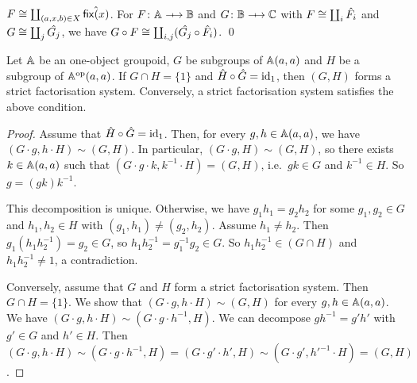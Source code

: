 \begin{proposition}
    \( F \cong \coprod_{(a,x,b) \in X} \hat{\mathsf{fix}(x)} \).
    For \( F \colon \Grp \profarrow \Grpb \) and \( G \colon \Grpb \profarrow \Grpc \) with \( F \cong \coprod_i \hat{F_i} \) and \( G \cong \coprod_j \hat{G_j} \), we have \( G \circ F \cong \coprod_{i,j} (\hat{G_j} \circ \hat{F_i}) \).
    \qed
\end{proposition}

\begin{proposition}
    Let \( \mathbb{A} \) be an one-object groupoid, \( G \) be subgroups of \( \mathbb{A}(a,a) \) and \( H \) be a subgroup of \( \mathbb{A}^{\mathrm{op}}(a,a) \).
    If \( G \cap H = \{ 1 \} \) and \( \hat{H} \circ \hat{G} = \mathrm{id}_1 \), then \( (G, H) \) forms a strict factorisation system.
    Conversely, a strict factorisation system satisfies the above condition.
\end{proposition}
\begin{proof}
    Assume that \( \hat{H} \circ \hat{G} = \mathrm{id}_1 \).
    Then, for every \( g, h \in \mathbb{A}(a,a) \), we have \( (G \cdot g, h \cdot H) \sim (G, H) \).
    In particular, \( (G \cdot g, H) \sim (G, H) \), so there exists \( k \in \mathbb{A}(a,a) \) such that \( (G \cdot g \cdot k, k^{-1} \cdot H) = (G, H) \), i.e.~\( gk \in G \) and \( k^{-1} \in H \).
    So \( g = (gk) k^{-1} \).

    This decomposition is unique.
    Otherwise, we have \( g_1 h_1 = g_2 h_2 \) for some \( g_1, g_2 \in G \) and \( h_1, h_2 \in H \) with \( (g_1, h_1) \neq (g_2, h_2) \).
    Assume \( h_1 \neq h_2 \).
    Then \( g_1 (h_1 h_2^{-1}) = g_2 \in G \), so \( h_1 h_2^{-1} = g_1^{-1} g_2 \in G \).
    So \( h_1 h_2^{-1} \in (G \cap H) \) and \( h_1 h_2^{-1} \neq 1 \), a contradiction.

    Conversely, assume that \( G \) and \( H \) form a strict factorisation system.
    Then \( G \cap H = \{ 1 \} \).
    We show that \( (G \cdot g, h \cdot H) \sim (G, H) \) for every \( g, h \in \mathbb{A}(a,a) \).
    We have \( (G \cdot g, h \cdot H) \sim (G \cdot g \cdot h^{-1}, H) \).
    We can decompose \( g h^{-1} = g' h' \) with \( g' \in G \) and \( h' \in H \).
    Then \( (G \cdot g, h \cdot H) \sim (G \cdot g \cdot h^{-1}, H) = (G \cdot g' \cdot h', H) \sim (G \cdot g', h'^{-1} \cdot H) = (G, H) \).
\end{proof}
